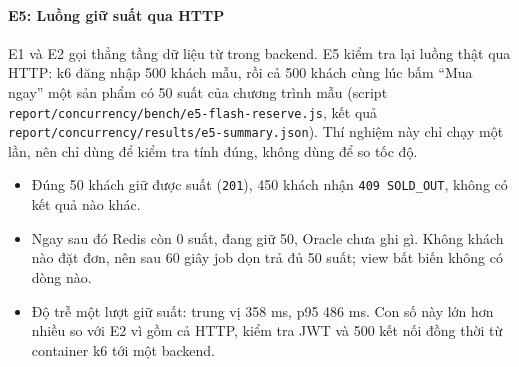 \paragraph{E5: Luồng giữ suất qua HTTP}
E1 và E2 gọi thẳng tầng dữ liệu từ trong backend. E5 kiểm tra lại luồng thật qua HTTP: k6 đăng nhập 500 khách mẫu, rồi cả 500 khách cùng lúc bấm ``Mua ngay'' một sản phẩm có 50 suất của chương trình mẫu (script \texttt{report/\allowbreak concurrency/\allowbreak bench/\allowbreak e5-flash-reserve.js}, kết quả \texttt{report/\allowbreak concurrency/\allowbreak results/\allowbreak e5-summary.json}). Thí nghiệm này chỉ chạy một lần, nên chỉ dùng để kiểm tra tính đúng, không dùng để so tốc độ.
\begin{itemize}
  \item Đúng 50 khách giữ được suất (\texttt{201}), 450 khách nhận \texttt{409 SOLD\_OUT}, không có kết quả nào khác.
  \item Ngay sau đó Redis còn 0 suất, đang giữ 50, Oracle chưa ghi gì. Không khách nào đặt đơn, nên sau 60 giây job dọn trả đủ 50 suất; view bất biến không có dòng nào.
  \item Độ trễ một lượt giữ suất: trung vị 358 ms, p95 486 ms. Con số này lớn hơn nhiều so với E2 vì gồm cả HTTP, kiểm tra JWT và 500 kết nối đồng thời từ container k6 tới một backend.
\end{itemize}
